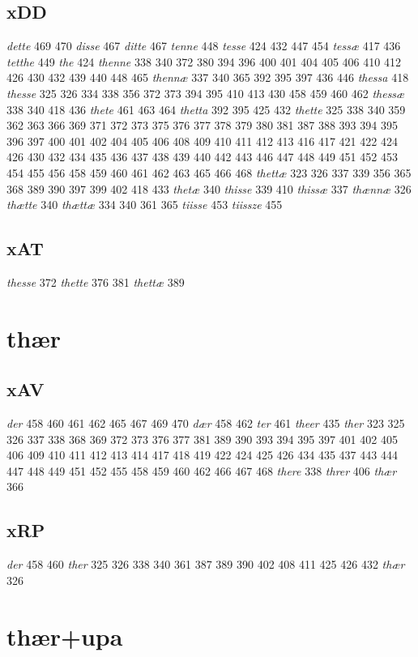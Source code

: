 \documentclass[a4paper,twocolumn]{article}
\begin{document}
\subsection{xDD}
\label{sec:orgc0e8113}
\emph{dette} 469 470 \emph{disse} 467 \emph{ditte} 467 \emph{tenne} 448 \emph{tesse} 424 432 447 454 \emph{tessæ} 417 436 \emph{tetthe} 449 \emph{the} 424 \emph{thenne} 338 340 372 380 394 396 400 401 404 405 406 410 412 426 430 432 439 440 448 465 \emph{thennæ} 337 340 365 392 395 397 436 446 \emph{thessa} 418 \emph{thesse} 325 326 334 338 356 372 373 394 395 410 413 430 458 459 460 462 \emph{thessæ} 338 340 418 436 \emph{thete} 461 463 464 \emph{thetta} 392 395 425 432 \emph{thette} 325 338 340 359 362 363 366 369 371 372 373 375 376 377 378 379 380 381 387 388 393 394 395 396 397 400 401 402 404 405 406 408 409 410 411 412 413 416 417 421 422 424 426 430 432 434 435 436 437 438 439 440 442 443 446 447 448 449 451 452 453 454 455 456 458 459 460 461 462 463 465 466 468 \emph{thettæ} 323 326 337 339 356 365 368 389 390 397 399 402 418 433 \emph{thetæ} 340 \emph{thisse} 339 410 \emph{thissæ} 337 \emph{thænnæ} 326 \emph{thætte} 340 \emph{thættæ} 334 340 361 365 \emph{tiisse} 453 \emph{tiissze} 455 
\subsection{xAT}
\label{sec:orgd753fc8}
\emph{thesse} 372 \emph{thette} 376 381 \emph{thettæ} 389 
\section{thær}
\label{sec:orgd6bb7fd}
\subsection{xAV}
\label{sec:org13c6277}
\emph{der} 458 460 461 462 465 467 469 470 \emph{dær} 458 462 \emph{ter} 461 \emph{theer} 435 \emph{ther} 323 325 326 337 338 368 369 372 373 376 377 381 389 390 393 394 395 397 401 402 405 406 409 410 411 412 413 414 417 418 419 422 424 425 426 434 435 437 443 444 447 448 449 451 452 455 458 459 460 462 466 467 468 \emph{there} 338 \emph{threr} 406 \emph{thær} 366 
\subsection{xRP}
\label{sec:org5c4496c}
\emph{der} 458 460 \emph{ther} 325 326 338 340 361 387 389 390 402 408 411 425 426 432 \emph{thær} 326 
\section{thær+upa}
\label{sec:org37c1f78}
\end{document}
